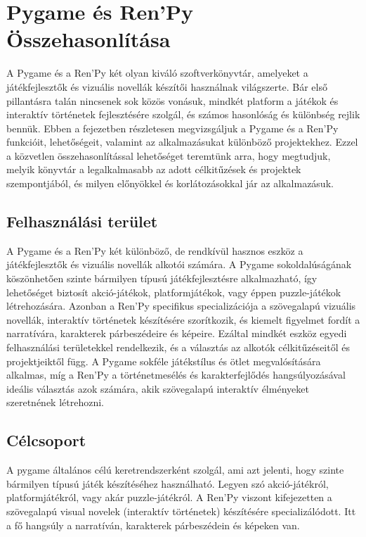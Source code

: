 \section{Pygame és Ren'Py Összehasonlítása} \cite{pygame-renpy}
\indent \indent A Pygame és a Ren'Py két olyan kiváló szoftverkönyvtár, amelyeket a játékfejlesztők és vizuális novellák készítői használnak világszerte. Bár első pillantásra talán nincsenek sok közös vonásuk, mindkét platform a játékok és interaktív történetek fejlesztésére szolgál, és számos hasonlóság és különbség rejlik bennük. Ebben a fejezetben részletesen megvizsgáljuk a Pygame és a Ren'Py funkcióit, lehetőségeit, valamint az alkalmazásukat különböző projektekhez. Ezzel a közvetlen összehasonlítással lehetőséget teremtünk arra, hogy megtudjuk, melyik könyvtár a legalkalmasabb az adott célkitűzések és projektek szempontjából, és milyen előnyökkel és korlátozásokkal jár az alkalmazásuk.

\subsection{Felhasználási terület}
\indent \indent A Pygame és a Ren'Py két különböző, de rendkívül hasznos eszköz a játékfejlesztők és vizuális novellák alkotói számára. A Pygame sokoldalúságának köszönhetően szinte bármilyen típusú játékfejlesztésre alkalmazható, így lehetőséget biztosít akció-játékok, platformjátékok, vagy éppen puzzle-játékok létrehozására. Azonban a Ren'Py specifikus specializációja a szövegalapú vizuális novellák, interaktív történetek készítésére szorítkozik, és kiemelt figyelmet fordít a narratívára, karakterek párbeszédeire és képeire. Ezáltal mindkét eszköz egyedi felhasználási területekkel rendelkezik, és a választás az alkotók célkitűzéseitől és projektjeiktől függ. A Pygame sokféle játékstílus és ötlet megvalósítására alkalmas, míg a Ren'Py a történetmesélés és karakterfejlődés hangsúlyozásával ideális választás azok számára, akik szövegalapú interaktív élményeket szeretnének létrehozni.

\subsection{Célcsoport}

\indent \indent A pygame általános célú keretrendszerként szolgál, ami azt jelenti, hogy szinte bármilyen típusú játék készítéséhez használható. Legyen szó akció-játékról, platformjátékról, vagy akár puzzle-játékról.
A Ren'Py viszont kifejezetten a szövegalapú visual novelek (interaktív történetek) készítésére specializálódott. Itt a fő hangsúly a narratíván, karakterek párbeszédein és képeken van.

